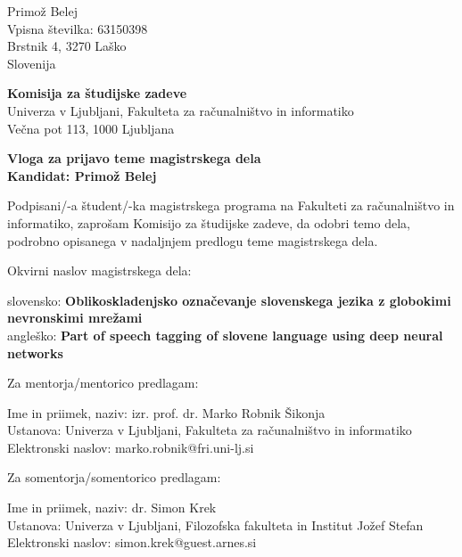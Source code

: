 \documentclass[a4paper, 12pt]{article}
\begin{document}
\noindent
Primož Belej\\
Vpisna številka: 63150398\\
Brstnik 4, 3270 Laško\\
Slovenija


\bigskip

{\bf Komisija za študijske zadeve}\\
Univerza v Ljubljani, Fakulteta za računalništvo in informatiko\\
Večna pot 113, 1000 Ljubljana

{\Large\bf
{\centering
    Vloga za prijavo teme magistrskega dela \\%
\large Kandidat: Primož Belej \\[10mm]}}


Podpisani/-a študent/-ka magistrskega programa na Fakulteti za računalništvo in informatiko, zaprošam Komisijo za študijske zadeve, da odobri temo dela, podrobno opisanega v nadaljnjem predlogu teme magistrskega dela.

Okvirni naslov magistrskega dela:

\hfill\begin{minipage}{\dimexpr\textwidth-2cm}
slovensko: {\bf Oblikoskladenjsko označevanje slovenskega jezika z globokimi nevronskimi mrežami}\\
angleško: {\bf Part of speech tagging of slovene language using deep neural networks}
\end{minipage}

Za mentorja/mentorico predlagam:

\hfill\begin{minipage}{\dimexpr\textwidth-2cm}
Ime in priimek, naziv: izr. prof. dr. Marko Robnik Šikonja\\
Ustanova: Univerza v Ljubljani, Fakulteta za računalništvo in informatiko\\
Elektronski naslov: marko.robnik@fri.uni-lj.si
\end{minipage}

Za somentorja/somentorico predlagam:

\hfill\begin{minipage}{\dimexpr\textwidth-2cm}
Ime in priimek, naziv: dr. Simon Krek\\
Ustanova: Univerza v Ljubljani, Filozofska fakulteta in Institut Jožef Stefan\\
Elektronski naslov: simon.krek@guest.arnes.si
\end{minipage}


\bigskip
\end{document}

